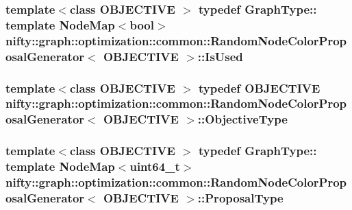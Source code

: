 \subsubsection[{Is\+Used}]{\setlength{\rightskip}{0pt plus 5cm}template$<$class O\+B\+J\+E\+C\+T\+I\+V\+E $>$ typedef Graph\+Type\+:: template Node\+Map$<$bool$>$ {\bf nifty\+::graph\+::optimization\+::common\+::\+Random\+Node\+Color\+Proposal\+Generator}$<$ O\+B\+J\+E\+C\+T\+I\+V\+E $>$\+::{\bf Is\+Used}}\label{classnifty_1_1graph_1_1optimization_1_1common_1_1RandomNodeColorProposalGenerator_a40c7d60c940dda11289016f362e4f6d9}
\hypertarget{classnifty_1_1graph_1_1optimization_1_1common_1_1RandomNodeColorProposalGenerator_a84ad8b16bdc71fdac75166ad9b37a747}{}
\subsubsection[{Objective\+Type}]{\setlength{\rightskip}{0pt plus 5cm}template$<$class O\+B\+J\+E\+C\+T\+I\+V\+E $>$ typedef O\+B\+J\+E\+C\+T\+I\+V\+E {\bf nifty\+::graph\+::optimization\+::common\+::\+Random\+Node\+Color\+Proposal\+Generator}$<$ O\+B\+J\+E\+C\+T\+I\+V\+E $>$\+::{\bf Objective\+Type}}\label{classnifty_1_1graph_1_1optimization_1_1common_1_1RandomNodeColorProposalGenerator_a84ad8b16bdc71fdac75166ad9b37a747}
\hypertarget{classnifty_1_1graph_1_1optimization_1_1common_1_1RandomNodeColorProposalGenerator_a3ee44363c937082dc3f8bd269da30d14}{}
\subsubsection[{Proposal\+Type}]{\setlength{\rightskip}{0pt plus 5cm}template$<$class O\+B\+J\+E\+C\+T\+I\+V\+E $>$ typedef Graph\+Type\+:: template Node\+Map$<$uint64\+\_\+t$>$ {\bf nifty\+::graph\+::optimization\+::common\+::\+Random\+Node\+Color\+Proposal\+Generator}$<$ O\+B\+J\+E\+C\+T\+I\+V\+E $>$\+::{\bf Proposal\+Type}}\label{classnifty_1_1graph_1_1optimization_1_1common_1_1RandomNodeColorProposalGenerator_a3ee44363c937082dc3f8bd269da30d14}



